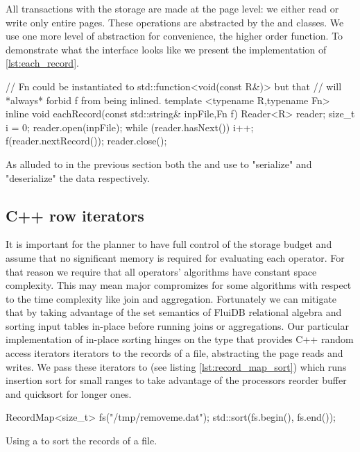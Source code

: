 All transactions with the storage are made at the page level: we
either read or write only entire pages. These operations are
abstracted by the  and  classes. We use one more level
of abstraction for convenience, the higher order 
function. To demonstrate what the interface looks like we present the
implementation of  \ref{lst:each_record}.

\begin{code}
\begin{cppcode}
// Fn could be instantiated to std::function<void(const R&)> but that
// will *always* forbid f from being inlined.
template <typename R,typename Fn>
inline void eachRecord(const std::string& inpFile,Fn f) {
  Reader<R> reader;
  size_t i = 0;
  reader.open(inpFile);
  while (reader.hasNext()) {
    i++;
    f(reader.nextRecord());
  }
  reader.close();
}
\end{cppcode}
\caption{\label{lst:each_record}}
\end{code}

As alluded to in the previous section both the  and 
use  to "serialize" and "deserialize" the data
respectively.

\subsection{C++ row iterators}

It is important for the planner to have full control of the storage
budget and assume that no significant memory is required for
evaluating each operator. For that reason we require that all
operators' algorithms have constant space complexity. This may mean
major compromizes for some algorithms with respect to the time
complexity like join and aggregation. Fortunately we can mitigate that
by taking advantage of the set semantics of FluiDB relational algebra
and sorting input tables in-place before running joins or
aggregations. Our particular implementation of in-place sorting hinges
on the  type that provides C++ random access iterators
iterators to the records of a file, abstracting the page reads and
writes. We pass these iterators to  (see listing
\ref{lst:record_map_sort}) which runs insertion sort for small ranges
to take advantage of the processors reorder buffer and quicksort for
longer ones.

\begin{code}
\begin{cppcode}
RecordMap<size_t> fs("/tmp/removeme.dat");
std::sort(fs.begin(), fs.end());
\end{cppcode}
  \caption{\label{lst:record_map_sort}Using a  to sort
    the records of a file.}
\end{code}

